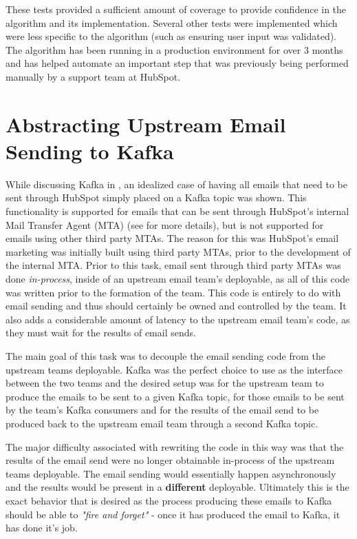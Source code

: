 These tests provided a sufficient amount of coverage to provide confidence in the algorithm and its implementation. Several other tests were implemented which were less specific to the algorithm (such as ensuring user input was validated). The algorithm has been running in a production environment for over 3 months and has helped automate an important step that was previously being performed manually by a support team at HubSpot.   

\section{Abstracting Upstream Email Sending to Kafka}
While discussing Kafka in , an idealized case of having all emails that need to be sent through HubSpot simply placed on a Kafka topic was shown. This functionality is supported for emails that can be sent through HubSpot's internal Mail Transfer Agent (MTA) (see  for more details), but is not supported for emails using other third party MTAs. The reason for this was HubSpot's email marketing was initially built using third party MTAs, prior to the development of the internal MTA. Prior to this task, email sent through third party MTAs was done \textit{in-process}, inside of an upstream email team's deployable, as all of this code was written prior to the formation of the \team{} team. This code is entirely to do with email sending and thus should certainly be owned and controlled by the \team{} team. It also adds a considerable amount of latency to the upstream email team's code, as they must wait for the results of email sends. 

The main goal of this task was to decouple the email sending code from the upstream teams deployable. Kafka was the perfect choice to use as the interface between the two teams and the desired setup was for the upstream team to produce the emails to be sent to a given Kafka topic, for those emails to be sent by the \team{} team's Kafka consumers and for the results of the email send to be produced back to the upstream email team through a second Kafka topic.

The major difficulty associated with rewriting the code in this way was that the results of the email send were no longer obtainable in-process of the upstream teams deployable. The email sending would essentially happen asynchronously and the results would be present in a \textbf{different} deployable. Ultimately this is the exact behavior that is desired as the process producing these emails to Kafka should be able to \textit{"fire and forget"} - once it has produced the email to Kafka, it has done it's job.

